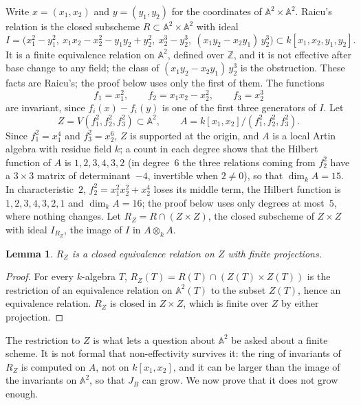 \documentclass[11pt,a4paper]{amsart}
\newtheorem{lemma}[theorem]{Lemma}
\theoremstyle{remark}
\newcommand{\A}{\mathbb A}
\newcommand{\Z}{\mathbb Z}
\begin{document}
Write $x = (x_1, x_2)$ and $y = (y_1, y_2)$ for the coordinates of $\A^2 \times \A^2$. Raicu's relation \cite[\S50]{kollar} is the closed subscheme $R \subset \A^2 \times \A^2$ with ideal
\[
I = \bigl(x_1^2 - y_1^2,\ x_1x_2 - x_2^2 - y_1y_2 + y_2^2,\ x_2^3 - y_2^3,\ (x_1y_2 - x_2y_1)\,y_2^3\bigr) \subset k[x_1, x_2, y_1, y_2].
\]
It is a finite equivalence relation on $\A^2$, defined over $\Z$, and it is not effective after base change to any field; the class of $(x_1y_2 - x_2y_1)\,y_2^3$ is the obstruction. These facts are Raicu's; the proof below uses only the first of them. The functions
\[
f_1 = x_1^2, \qquad f_2 = x_1x_2 - x_2^2, \qquad f_3 = x_2^3
\]
are invariant, since $f_i(x) - f_i(y)$ is one of the first three generators of $I$. Let
\[
Z = V(f_1^2, f_2^2, f_3^2) \subset \A^2, \qquad A = k[x_1, x_2]/(f_1^2, f_2^2, f_3^2).
\]
Since $f_1^2 = x_1^4$ and $f_3^2 = x_2^6$, $Z$ is supported at the origin, and $A$ is a local Artin algebra with residue field $k$; a count in each degree shows that the Hilbert function of $A$ is $1, 2, 3, 4, 3, 2$ (in degree~$6$ the three relations coming from $f_2^2$ have a $3 \times 3$ matrix of determinant~$-4$, invertible when $2 \ne 0$), so that $\dim_k A = 15$. In characteristic~$2$, $f_2^2 = x_1^2x_2^2 + x_2^4$ loses its middle term, the Hilbert function is $1, 2, 3, 4, 3, 2, 1$ and $\dim_k A = 16$; the proof below uses only degrees at most~$5$, where nothing changes. Let $R_Z = R \cap (Z \times Z)$, the closed subscheme of $Z \times Z$ with ideal $I_{R_Z}$, the image of $I$ in $A \otimes_k A$.

\begin{lemma}\label{lem:restriction}
$R_Z$ is a closed equivalence relation on $Z$ with finite projections.
\end{lemma}

\begin{proof}
For every $k$-algebra $T$, $R_Z(T) = R(T) \cap (Z(T) \times Z(T))$ is the restriction of an equivalence relation on $\A^2(T)$ to the subset $Z(T)$, hence an equivalence relation. $R_Z$ is closed in $Z \times Z$, which is finite over $Z$ by either projection.
\end{proof}

The restriction to $Z$ is what lets a question about $\A^2$ be asked about a finite scheme. It is not formal that non-effectivity survives it: the ring of invariants of $R_Z$ is computed on $A$, not on $k[x_1, x_2]$, and it can be larger than the image of the invariants on $\A^2$, so that $J_B$ can grow. We now prove that it does not grow enough.
\end{document}
